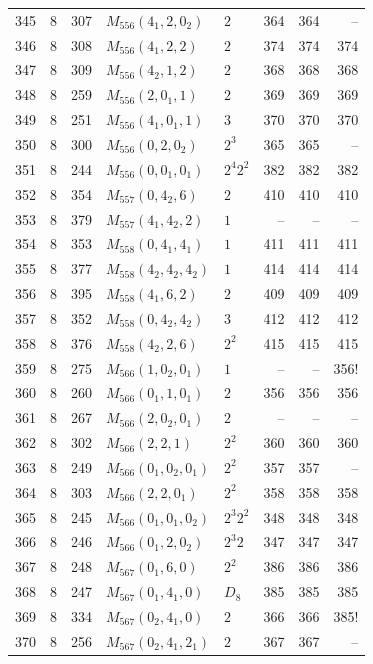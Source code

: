 \documentclass[11pt,a4paper]{article}
\begin{document}
\begin{longtable}{rrr|l|l|rrr}
345 & 8 & 307 & $M_{556}(4_1,2,0_2)$ & $2$ & 364 & 364 & --\\
346 & 8 & 308 & $M_{556}(4_1,2,2)$ & $2$ & 374 & 374 & 374\\
347 & 8 & 309 & $M_{556}(4_2,1,2)$ & $2$ & 368 & 368 & 368\\
348 & 8 & 259 & $M_{556}(2,0_1,1)$ & $2$ & 369 & 369 & 369\\
349 & 8 & 251 & $M_{556}(4_1,0_1,1)$ & $3$ & 370 & 370 & 370\\
350 & 8 & 300 & $M_{556}(0,2,0_2)$ & $2^3$ & 365 & 365 & --\\
351 & 8 & 244 & $M_{556}(0,0_1,0_1)$ & $2^4 2^2$ & 382 & 382 & 382\\
352 & 8 & 354 & $M_{557}(0,4_2,6)$ & $2$ & 410 & 410 & 410\\
353 & 8 & 379 & $M_{557}(4_1,4_2,2)$ & $1$ & -- & -- & --\\
354 & 8 & 353 & $M_{558}(0,4_1,4_1)$ & $1$ & 411 & 411 & 411\\
355 & 8 & 377 & $M_{558}(4_2,4_2,4_2)$ & $1$ & 414 & 414 & 414\\
356 & 8 & 395 & $M_{558}(4_1,6,2)$ & $2$ & 409 & 409 & 409\\
357 & 8 & 352 & $M_{558}(0,4_2,4_2)$ & $3$ & 412 & 412 & 412\\
358 & 8 & 376 & $M_{558}(4_2,2,6)$ & $2^2$ & 415 & 415 & 415\\
359 & 8 & 275 & $M_{566}(1,0_2,0_1)$ & $1$ & -- & -- & 356!\\
360 & 8 & 260 & $M_{566}(0_1,1,0_1)$ & $2$ & 356 & 356 & 356\\
361 & 8 & 267 & $M_{566}(2,0_2,0_1)$ & $2$ & -- & -- & --\\
362 & 8 & 302 & $M_{566}(2,2,1)$ & $2^2$ & 360 & 360 & 360\\
363 & 8 & 249 & $M_{566}(0_1,0_2,0_1)$ & $2^2$ & 357 & 357 & --\\
364 & 8 & 303 & $M_{566}(2,2,0_1)$ & $2^2$ & 358 & 358 & 358\\
365 & 8 & 245 & $M_{566}(0_1,0_1,0_2)$ & $2^3 2^2$ & 348 & 348 & 348\\
366 & 8 & 246 & $M_{566}(0_1,2,0_2)$ & $2^3 2$ & 347 & 347 & 347\\
367 & 8 & 248 & $M_{567}(0_1,6,0)$ & $2^2$ & 386 & 386 & 386\\
368 & 8 & 247 & $M_{567}(0_1,4_1,0)$ & $D_8$ & 385 & 385 & 385\\
369 & 8 & 334 & $M_{567}(0_2,4_1,0)$ & $2$ & 366 & 366 & 385!\\
370 & 8 & 256 & $M_{567}(0_2,4_1,2_1)$ & $2$ & 367 & 367 & --\\

\end{longtable}
\end{document}

